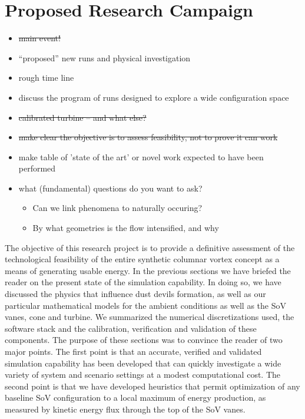\section{Proposed Research Campaign}
\label{sec:proposed_work}

\begin{itemize}
\item \st{main event!}
\item ``proposed'' new runs and physical investigation
\item rough time line
\item discuss the program of runs designed to explore a wide configuration space
\item \st{calibrated turbine -- and what else?}
\item \st{make clear the objective is to assess feasibility, not to prove it can work}
\item make table of 'state of the art' or novel work expected to have been performed
\item what (fundamental) questions do you want to ask?
      \begin{itemize}
      \item Can we link phenomena to naturally occuring?
      \item By what geometries is the flow intensified, and why
      \end{itemize}
\end{itemize}

The objective of this research project is to provide a definitive
assessment of the  
technological feasibility of the entire synthetic columnar vortex
concept as a means of generating usable energy. In the 
previous sections we have briefed the reader on the present state of the
simulation capability. In doing so, we have discussed the physics that
influence dust devils formation, as well as our particular mathematical
models for the ambient conditions as well as the SoV vanes, cone and
turbine. We summarized the numerical discretizations used, the software
stack and the calibration, verification and validation of these
components. The purpose of these sections was to convince the reader of
two major points. The first point is that an accurate, verified and
validated simulation capability has been developed that can quickly
investigate a wide variety of system and scenario settings at a modest
computational cost. The second point is that we have developed
heuristics that permit optimization of any baseline SoV configuration to
a local maximum of energy production, as measured by kinetic energy flux
through the top of the SoV vanes.  

